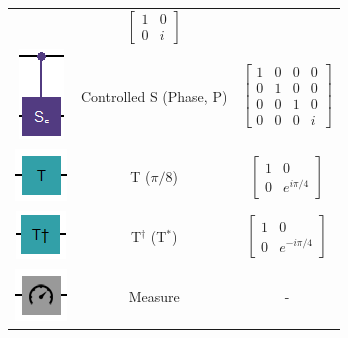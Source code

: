 \documentclass[conference]{IEEEtran}
\begin{document}
\begin{appendices}
\begin{table}[!h]
\begin{center}
\begin{tabular}{ccc}
    &
    $
    \begin{bmatrix}
        1 & 0 \\
        0 & i
    \end{bmatrix}
    $
    \\
    \begin{minipage}[c]{1cm}
        \includegraphics{img/gate_cs.png}
    \end{minipage}
    & Controlled S (Phase, P)
    &
    $
    \begin{bmatrix}
        1 & 0 & 0 & 0 \\
        0 & 1 & 0 & 0 \\
        0 & 0 & 1 & 0 \\
        0 & 0 & 0 & i
    \end{bmatrix}
    $
    \\
    \begin{minipage}[c]{1cm}
        \includegraphics{img/gate_t.png}
    \end{minipage}
    & T ($\pi/8$)
    &
    $
    \begin{bmatrix}
        1 & 0 \\
        0 & e^{i\pi/4}
    \end{bmatrix}
    $
    \\
    \begin{minipage}[c]{1cm}
        \includegraphics{img/gate_t_dagger.png}
    \end{minipage}
    & T$^\dagger$ (T$^*$)
    &
    $
    \begin{bmatrix}
        1 & 0 \\
        0 & e^{-i\pi/4}
    \end{bmatrix}
    $
    \\
    \begin{minipage}[c]{1cm}
        \includegraphics{img/gate_measure.png}
    \end{minipage}
    & Measure
    &
    -
    \\
    \bottomrule
\end{tabular}
\end{center}
\end{table}


\end{appendices}
\end{document}
